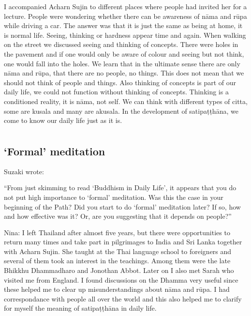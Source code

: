 I accompanied Acharn Sujin to different places where people had invited her for a lecture. People were wondering whether there can be awareness of nāma and rūpa while driving a car. The answer was that it is just the same as being at home, it is normal life. Seeing, thinking or hardness appear time and again. When walking on the street we discussed seeing and thinking of concepts. There were holes in the pavement and if one would only be aware of colour and seeing but not think, one would fall into the holes. We learn that in the ultimate sense there are only nāma and rūpa, that there are no people, no things. This does not mean that we should not think of people and things. Also thinking of concepts is part of our daily life, we could not function without thinking of concepts. Thinking is a conditioned reality, it is nāma, not self. We can think with different types of citta, some are kusala and many are akusala. In the development of satipaṭṭhāna, we come to know our daily life just as it is.

\chapter[`Formal’ meditation]{}
\section*{`Formal’ meditation}



Suzaki  wrote: 

``From just skimming to read ‘Buddhism in Daily Life’, it appears that you do not put high importance to `formal’ meditation. Was this the case in your beginning of the Path? Did
you start to do `formal’ meditation later? If so, how and how effective was it? Or, are you suggesting that it depends on people?”

Nina: I left Thailand after almost five years, but there were opportunities to return many times and take part in pilgrimages to India and Sri Lanka together with Acharn Sujin. She taught at the Thai language school to foreigners and several of them took an interest in the teachings. Among them were the late Bhikkhu Dhammadharo and Jonothan Abbot. Later on I also met Sarah who visited me from England. I found discussions on the Dhamma very useful since these helped me to clear up misunderstandings about nāma and rūpa. I had correspondance with people all over the world and this also helped me to clarify for myself the meaning of satipaṭṭhāna in daily life.

